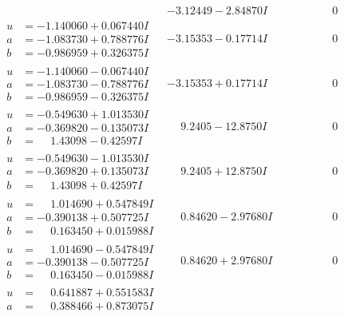\documentclass[1p]{elsarticle_modified}
\theoremstyle{definition}
\begin{document}
$$\begin{array}{c|c|c}
 & -3.12449 - 2.84870 I & \phantom{-0.000000 } 0 \\ \hline\begin{aligned}
u &= -1.140060 + 0.067440 I \\
a &= -1.083730 + 0.788776 I \\
b &= -0.986959 + 0.326375 I\end{aligned}
 & -3.15353 - 0.17714 I & \phantom{-0.000000 } 0 \\ \hline\begin{aligned}
u &= -1.140060 - 0.067440 I \\
a &= -1.083730 - 0.788776 I \\
b &= -0.986959 - 0.326375 I\end{aligned}
 & -3.15353 + 0.17714 I & \phantom{-0.000000 } 0 \\ \hline\begin{aligned}
u &= -0.549630 + 1.013530 I \\
a &= -0.369820 - 0.135073 I \\
b &= \phantom{-}1.43098 - 0.42597 I\end{aligned}
 & \phantom{-}9.2405 - 12.8750 I & \phantom{-0.000000 } 0 \\ \hline\begin{aligned}
u &= -0.549630 - 1.013530 I \\
a &= -0.369820 + 0.135073 I \\
b &= \phantom{-}1.43098 + 0.42597 I\end{aligned}
 & \phantom{-}9.2405 + 12.8750 I & \phantom{-0.000000 } 0 \\ \hline\begin{aligned}
u &= \phantom{-}1.014690 + 0.547849 I \\
a &= -0.390138 + 0.507725 I \\
b &= \phantom{-}0.163450 + 0.015988 I\end{aligned}
 & \phantom{-}0.84620 - 2.97680 I & \phantom{-0.000000 } 0 \\ \hline\begin{aligned}
u &= \phantom{-}1.014690 - 0.547849 I \\
a &= -0.390138 - 0.507725 I \\
b &= \phantom{-}0.163450 - 0.015988 I\end{aligned}
 & \phantom{-}0.84620 + 2.97680 I & \phantom{-0.000000 } 0 \\ \hline\begin{aligned}
u &= \phantom{-}0.641887 + 0.551583 I \\
a &= \phantom{-}0.388466 + 0.873075 I \\

\end{aligned}
\end{array}$$
\end{document}
